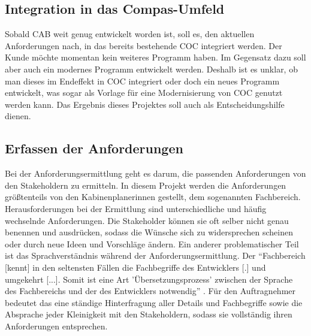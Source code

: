 \documentclass [12pt, a4paper, oneside, titlepage, ngerman]{article}
\begin{document}
\subsection{Integration in das Compas-Umfeld}
Sobald \ac{CAB} weit genug entwickelt worden ist, soll es, den aktuellen Anforderungen nach, in das bereits bestehende \ac{COC} integriert werden. Der Kunde möchte momentan kein weiteres Programm haben. %
Im Gegensatz dazu soll aber auch ein modernes Programm entwickelt werden. Deshalb ist es unklar, ob man dieses im Endeffekt in \ac{COC} integriert oder doch ein neues Programm entwickelt, was sogar als Vorlage für eine Modernisierung von \ac{COC} genutzt werden kann. Das Ergebnis dieses Projektes soll auch als Entscheidungshilfe dienen.\\



\subsection{Erfassen der Anforderungen} \label{anforderungen}
Bei der Anforderungsermittlung geht es darum, die passenden Anforderungen von den Stakeholdern zu ermitteln. In diesem Projekt werden die Anforderungen größtenteils von den Kabinenplanerinnen gestellt, dem sogenannten Fachbereich. \\

\noindent Herausforderungen bei der Ermittlung sind unterschiedliche und häufig wechselnde Anforderungen. Die Stakeholder können sie oft selber nicht genau benennen und ausdrücken, sodass die Wünsche sich zu widersprechen scheinen oder durch neue Ideen und Vorschläge ändern. %
Ein anderer problematischer Teil ist das Sprachverständnis während der Anforderungsermittlung. Der "`Fachbereich [kennt] in den seltensten Fällen die Fachbegriffe des Entwicklers [.] und umgekehrt [...]. Somit ist eine Art 'Übersetzungsprozess' zwischen der Sprache des Fachbereichs und der des Entwicklers notwendig"' \cite[S.319]{Alpar2016} . 
Für den Auftragnehmer bedeutet das eine ständige Hinterfragung aller Details und Fachbegriffe sowie die Absprache jeder Kleinigkeit mit den Stakeholdern, sodass sie vollständig ihren Anforderungen entsprechen. \\
\end{document}
